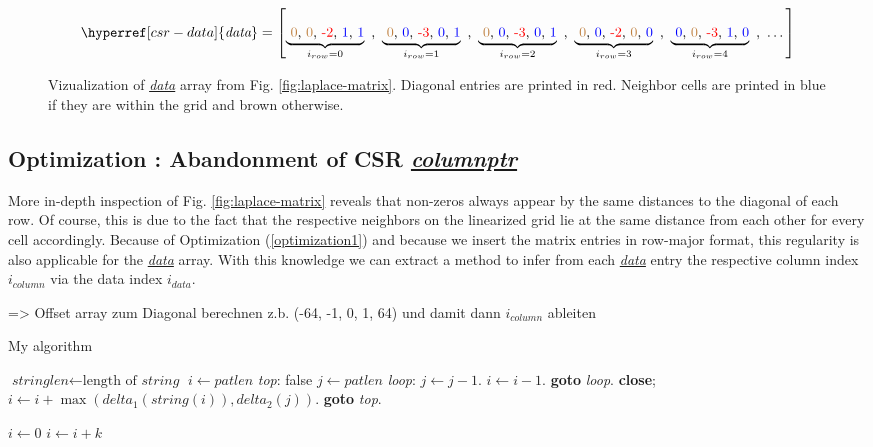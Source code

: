 \newpage
\begin{figure*}
\centering
\[
	\hyperref[csr-data]{\textit{data}} = \left[ 
	\underbrace{\text{ \textcolor{brown}{0}, \textcolor{brown}{0}, \textcolor{red}{-2}, \textcolor{blue}{1}, \textcolor{blue}{1}}}_{i_{row} = 0} \text{ , }
	\underbrace{\text{ \textcolor{brown}{0}, \textcolor{blue}{0}, \textcolor{red}{-3}, \textcolor{blue}{0}, \textcolor{blue}{1}}}_{i_{row} = 1} \text{ , }
	\underbrace{\text{ \textcolor{brown}{0}, \textcolor{blue}{0}, \textcolor{red}{-3}, \textcolor{blue}{0}, \textcolor{blue}{1}}}_{i_{row} = 2} \text{ , }
	\underbrace{\text{ \textcolor{brown}{0}, \textcolor{blue}{0}, \textcolor{red}{-2}, \textcolor{brown}{0}, \textcolor{blue}{0}}}_{i_{row} = 3} \text{ , }
	\underbrace{\text{ \textcolor{blue}{0}, \textcolor{brown}{0}, \textcolor{red}{-3}, \textcolor{blue}{1}, \textcolor{blue}{0}}}_{i_{row} = 4} \text{ , }
	\dots
	\right]
\]
\caption{Vizualization of \hyperref[csr-data]{\textit{data}} array from Fig. \ref{fig:laplace-matrix}. Diagonal entries are printed in red. Neighbor cells are printed in blue if they are within the grid and brown otherwise.
}
\label{fig:data-columnptr-me1rge}
\end{figure*} 

\subsection{Optimization : Abandonment of CSR \hyperref[csr-columnptr]{\textit{columnptr}}}
More in-depth inspection of Fig. \ref{fig:laplace-matrix} reveals that non-zeros always appear by the same distances to the diagonal of each row. Of course, this is due to the fact that the respective neighbors on the linearized grid lie at the same distance from each other for every cell accordingly. Because of Optimization  (\ref{optimization1}) and because we insert the matrix entries in row-major format, this regularity is also applicable for the \hyperref[csr-data]{\textit{data}} array. With this knowledge we can extract a method to infer from each \hyperref[csr-data]{\textit{data}} entry the respective column index $i_{column}$ via the data index $i_{data}$.
\par [\dots]
\par => Offset array zum Diagonal berechnen z.b. (-64, -1, 0, 1, 64) und damit dann $i_{column}$ ableiten

\newpage
\begin{algorithm}
\caption{My algorithm}\label{euclid}
\begin{algorithmic}[1]
\State $\textit{stringlen} \gets \text{length of }\textit{string}$
\State $i \gets \textit{patlen}$
\BState \emph{top}:
 \Return false
\EndIf
\State $j \gets \textit{patlen}$
\BState \emph{loop}:
\State $j \gets j-1$.
\State $i \gets i-1$.
\State \textbf{goto} \emph{loop}.
\State \textbf{close};
\EndIf
\State $i \gets i+\max(\textit{delta}_1(\textit{string}(i)),\textit{delta}_2(j))$.
\State \textbf{goto} \emph{top}.
\EndProcedure
\end{algorithmic}
\end{algorithm}

\begin{algorithmic}
    \State $i\gets 0$
\Else
        \State $i\gets i+k$
    \EndIf
\EndIf
\end{algorithmic}